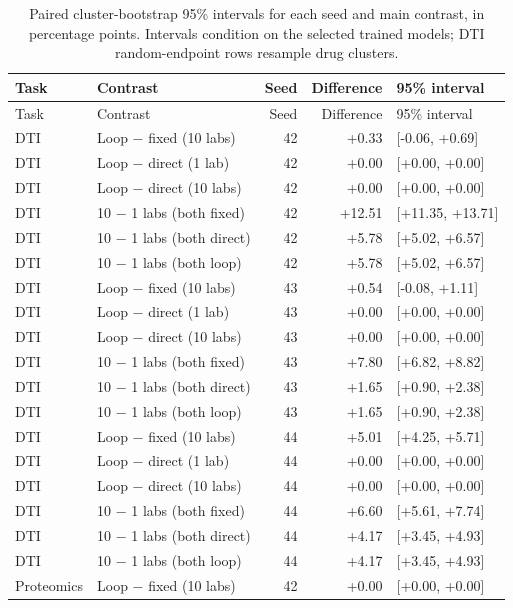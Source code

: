 \begin{longtable}{llrrl}
\caption{Paired cluster-bootstrap 95\% intervals for each seed and main contrast, in percentage points. Intervals condition on the selected trained models; DTI random-endpoint rows resample drug clusters.}\label{tab:strong-uncertainty}\\
\toprule Task & Contrast & Seed & Difference & 95\% interval \\ \midrule\endfirsthead
\toprule Task & Contrast & Seed & Difference & 95\% interval \\ \midrule\endhead
DTI & Loop $-$ fixed (10 labs) & 42 & +0.33 & [-0.06, +0.69] \\
DTI & Loop $-$ direct (1 lab) & 42 & +0.00 & [+0.00, +0.00] \\
DTI & Loop $-$ direct (10 labs) & 42 & +0.00 & [+0.00, +0.00] \\
DTI & 10 $-$ 1 labs (both fixed) & 42 & +12.51 & [+11.35, +13.71] \\
DTI & 10 $-$ 1 labs (both direct) & 42 & +5.78 & [+5.02, +6.57] \\
DTI & 10 $-$ 1 labs (both loop) & 42 & +5.78 & [+5.02, +6.57] \\
\midrule
DTI & Loop $-$ fixed (10 labs) & 43 & +0.54 & [-0.08, +1.11] \\
DTI & Loop $-$ direct (1 lab) & 43 & +0.00 & [+0.00, +0.00] \\
DTI & Loop $-$ direct (10 labs) & 43 & +0.00 & [+0.00, +0.00] \\
DTI & 10 $-$ 1 labs (both fixed) & 43 & +7.80 & [+6.82, +8.82] \\
DTI & 10 $-$ 1 labs (both direct) & 43 & +1.65 & [+0.90, +2.38] \\
DTI & 10 $-$ 1 labs (both loop) & 43 & +1.65 & [+0.90, +2.38] \\
\midrule
DTI & Loop $-$ fixed (10 labs) & 44 & +5.01 & [+4.25, +5.71] \\
DTI & Loop $-$ direct (1 lab) & 44 & +0.00 & [+0.00, +0.00] \\
DTI & Loop $-$ direct (10 labs) & 44 & +0.00 & [+0.00, +0.00] \\
DTI & 10 $-$ 1 labs (both fixed) & 44 & +6.60 & [+5.61, +7.74] \\
DTI & 10 $-$ 1 labs (both direct) & 44 & +4.17 & [+3.45, +4.93] \\
DTI & 10 $-$ 1 labs (both loop) & 44 & +4.17 & [+3.45, +4.93] \\
\midrule
Proteomics & Loop $-$ fixed (10 labs) & 42 & +0.00 & [+0.00, +0.00] \\

\end{longtable}
